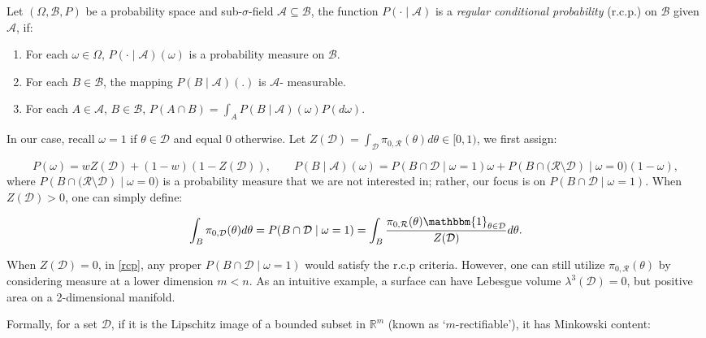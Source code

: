 \documentclass[10pt]{article}
\newcommand{\mc}[1]{\mathcal{#1}}
\DeclareMathOperator{\1}{\mathbbm{1}}
\begin{document}
Let $(\Omega, \mathscr B, P)$ be a probability space and sub-$\sigma$-field $\mathscr A\subseteq \mathscr B$, the function $P(\cdot\mid \mathscr A)$ is a {\it regular conditional probability} (r.c.p.) \citep{kolmogorov1950foundations} on $\mathscr B$ given $\mathscr A$, if:
\begin{enumerate}
	\item For each $\omega\in  \Omega$, $P(\cdot\mid \mathscr A)(\omega)$ is a probability measure on $\mathscr B$.
	\item For each $B\in \mathscr B$, the mapping $P(B\mid \mathscr A)(.)$ is $\mathscr A$- measurable.
	\item For each $A \in \mathscr A$, $B\in \mathscr B$, $P(A\cap B)=\int_{A} P(B\mid \mathscr A)(\omega)P(d\omega)$.
\end{enumerate}

In our case, recall $\omega=1$ if $\theta\in \mc D$ and equal $0$ otherwise. Let $Z(\mc D)=\int_{\mc D} \pi_{0,\mc R}(\theta)d\theta \in [0,1)$, we first assign:

\begin{equation}
\label{rcp}
	P(\omega) = w Z(\mc D)  + (1-w)(1-Z(\mc D)), \qquad  P(B \mid  \mathscr A)(\omega)={P({B\cap  \mc D} \mid \omega=1)} \omega +  {P({B\cap (\mc R \setminus \mc D})\mid \omega=0)}(1-\omega),
\end{equation}
where $P({B\cap (\mc R \setminus \mc D})\mid \omega=0)$ is a probability measure that we are not interested in; rather, our focus is on ${P({B\cap  \mc D} \mid \omega=1)}$. When $Z(\mc D)>0$, one can simply define:

\begin{equation}
\begin{aligned}
\label{exact_prior1}
 \int_{B} \pi_{0,\mc D}(\theta) d\theta= {P({B\cap  \mc D} \mid \omega=1)}=\int_{B} \frac{  \pi_{0,\mc R}(\theta) \mathbbm{1}_{\theta\in \mc D}}{ Z(\mc D) } d\theta  .
\end{aligned}
\end{equation}

When $Z(\mc D)=0$, in \eqref{rcp}, any proper ${P({B\cap  \mc D} \mid \omega=1)}$ would satisfy the r.c.p criteria. However, one can still utilize $\pi_{0,\mc R}(\theta)$ by considering measure at a lower dimension $m<n$. As an intuitive example, a surface can have Lebesgue volume $\lambda^3(\mc D)=0$, but positive area on a 2-dimensional manifold.

Formally, for a set $\mc D$, if it is the Lipschitz image of a bounded subset in $\mathbb R^m$ (known as `$m$-rectifiable'), it has Minkowski content:
\end{document}
